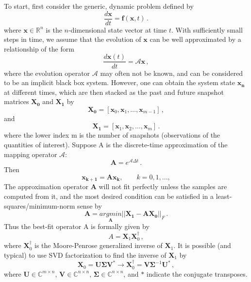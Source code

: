To start, first consider the generic, dynamic problem defined by 
\begin{equation}
  \frac{d{\mathbf{x}}}{dt}=\mathbf{f}(\mathbf{x},t) \, .
  \label{eq:dynamic_problem}
\end{equation}
where $\mathbf{x} \in \mathbb{R}^{n}$ is the $n$-dimensional state vector at time $t$. 
With sufficiently small steps in time, we assume that the evolution of  $\mathbf{x}$ can be well approximated by a relationship of the form 
\begin{equation}
 \frac{d{\mathbf{x}}(t)}{dt}=\mathcal{A}\mathbf{x} \, ,
 \label{eq:linearized_model}
\end{equation}
where the evolution operator $\mathcal{A}$ may often not be known, and can be considered to be an implicit black box system.
However, one can obtain the system state $\mathbf{x_n}$ at different times, which are then stacked as the past and future snapshot matrices $ \mathbf{X_0}$ and $ \mathbf{X_1}$ by
\begin{equation}
\label{eq:past_data}
\mathbf{X_0}=\left[ \mathbf{x}_0, \mathbf{x}_1, \ldots, \mathbf{x}_{m-1} \right] \, ,
\end{equation}
and
\begin{equation}
\label{eq:future_data}
\mathbf{X_1}=\left[ \mathbf{x}_1, \mathbf{x}_2, \ldots, \mathbf{x}_{m} \right] \, .
\end{equation}
where the lower index m is the number of snapshots (observations of the quantities of interest).
Suppose A is the discrete-time approximation of the mapping operator $\mathcal{A}$:
\begin{equation}
\label{eq:A}
\mathbf{A} = e^{\mathcal{A} \Delta t} \, .
\end{equation}
Then 
\begin{equation}
\label{eq:x0x1}
\mathbf{x_{k+1}} = \mathbf{A} \mathbf{x_{k}}, \quad \quad k = 0,1,...,
\end{equation}
The approximation operator $\mathbf{A}$ will not fit perfectly unless the samples are computed from it, and the most desired condition can be satisfied in a least-squares/minimum-norm sense by
\begin{equation}
\label{eq:least}
\mathbf{A} =  \underset{\mathbf{A}}{argmin} ||\mathbf{X_1} - \mathbf{A} \mathbf{X_0}||_F \, .
\end{equation}
Thus the best-fit operator A is formally given by 
\begin{equation}
\label{eq:fullA}
A = \mathbf{X}_1 \mathbf{X}_0^{\dagger} \, ,
\end{equation}
where $\mathbf{X}_0^{\dagger}$ is the Moore-Penrose generalized inverse of $\mathbf{X}_1$.
It is possible (and typical) to use SVD factorization to find the inverse of $\mathbf{X}_1$ by
\begin{equation}
\label{eq:svd}
\mathbf{X}_0 = \mathbf{U} \bm{\Sigma} \mathbf{V}^{*} \rightarrow \mathbf{X}_0^{\dagger} = \mathbf{V} \bm{\Sigma}^{-1} \mathbf{U}^* \, ,
\end{equation}
where $\mathbf{U} \in \mathbb{C}^{m\times n}$, $\mathbf{V} \in \mathbb{C}^{n\times n}$, $\bm{\Sigma} \in \mathbb{C}^{n\times n}$, and $*$ indicate the conjugate transposes. 

